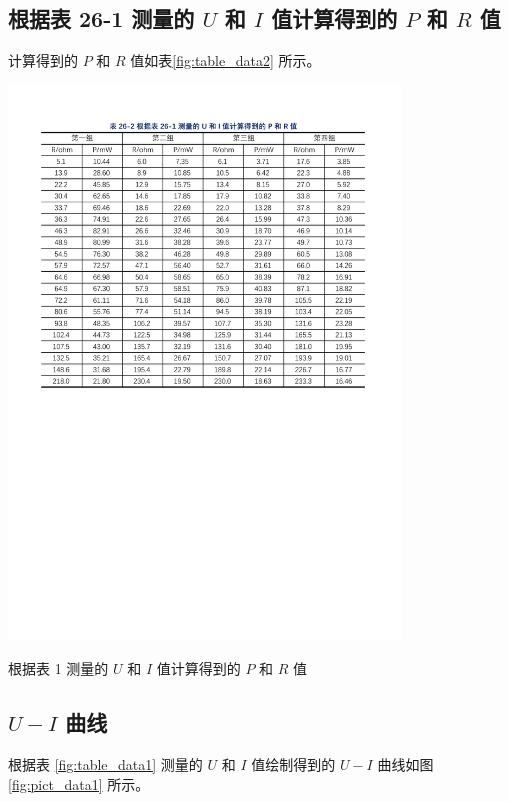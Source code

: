 \documentclass[12pt]{article}
\begin{document}
\subsection{\normalfont 根据表 26-1 测量的 $U$ 和 $I$ 值计算得到的 $P$ 和 $R$ 值}

计算得到的 $P$ 和 $R$ 值如表\ref{fig:table_data2} 所示。

\begin{table}[H] %
    \centering
    \includegraphics[width=0.78\textwidth]{./figures/表2.pdf} 
    \caption{根据表 1 测量的 $U$ 和 $I$ 值计算得到的 $P$ 和 $R$ 值}
    \label{fig:table_data2}
\end{table}

\subsection{\normalfont $U-I$ 曲线}

根据表 \ref{fig:table_data1} 测量的 $U$ 和 $I$ 值绘制得到的 $U-I$ 曲线如图 \ref{fig:pict_data1} 所示。
\end{document}
